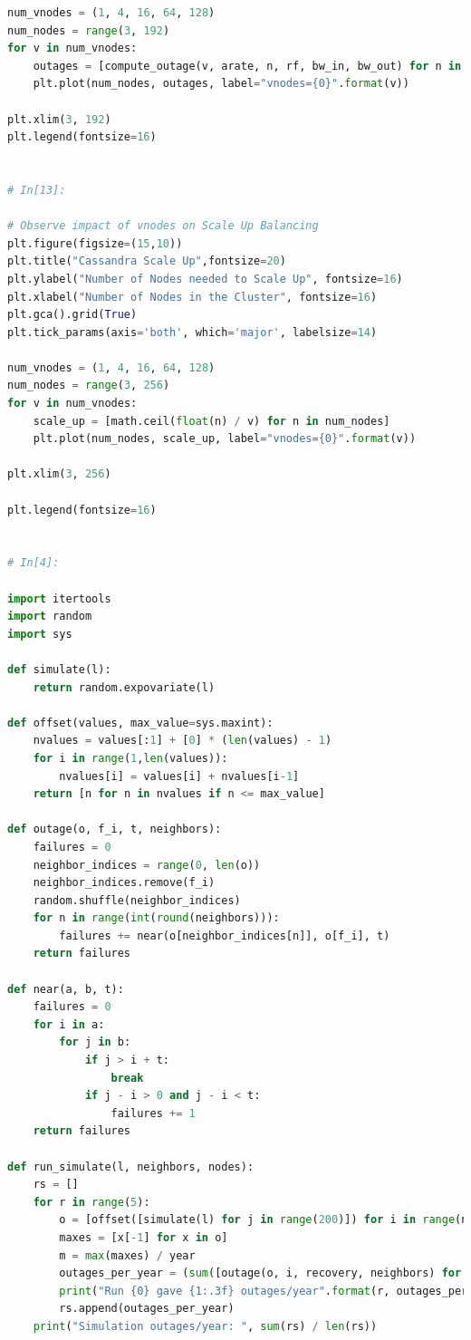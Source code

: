\documentclass{article}
\begin{document}
\begin{lstlisting}[language=Python]
num_vnodes = (1, 4, 16, 64, 128)
num_nodes = range(3, 192)
for v in num_vnodes:
    outages = [compute_outage(v, arate, n, rf, bw_in, bw_out) for n in num_nodes]
    plt.plot(num_nodes, outages, label="vnodes={0}".format(v))

plt.xlim(3, 192)
plt.legend(fontsize=16)


# In[13]:

# Observe impact of vnodes on Scale Up Balancing
plt.figure(figsize=(15,10))
plt.title("Cassandra Scale Up",fontsize=20)
plt.ylabel("Number of Nodes needed to Scale Up", fontsize=16)
plt.xlabel("Number of Nodes in the Cluster", fontsize=16)
plt.gca().grid(True)
plt.tick_params(axis='both', which='major', labelsize=14)

num_vnodes = (1, 4, 16, 64, 128)
num_nodes = range(3, 256)
for v in num_vnodes:
    scale_up = [math.ceil(float(n) / v) for n in num_nodes]
    plt.plot(num_nodes, scale_up, label="vnodes={0}".format(v))

plt.xlim(3, 256)

plt.legend(fontsize=16)


# In[4]:

import itertools
import random
import sys

def simulate(l):
    return random.expovariate(l)

def offset(values, max_value=sys.maxint):
    nvalues = values[:1] + [0] * (len(values) - 1)
    for i in range(1,len(values)):
        nvalues[i] = values[i] + nvalues[i-1]
    return [n for n in nvalues if n <= max_value]

def outage(o, f_i, t, neighbors):
    failures = 0
    neighbor_indices = range(0, len(o))
    neighbor_indices.remove(f_i)
    random.shuffle(neighbor_indices)
    for n in range(int(round(neighbors))):
        failures += near(o[neighbor_indices[n]], o[f_i], t)
    return failures

def near(a, b, t):
    failures = 0
    for i in a:
        for j in b:
            if j > i + t:
                break
            if j - i > 0 and j - i < t:
                failures += 1
    return failures

def run_simulate(l, neighbors, nodes):
    rs = []
    for r in range(5):
        o = [offset([simulate(l) for j in range(200)]) for i in range(nodes)]
        maxes = [x[-1] for x in o]
        m = max(maxes) / year
        outages_per_year = (sum([outage(o, i, recovery, neighbors) for i in range(nodes)]) / m)
        print("Run {0} gave {1:.3f} outages/year".format(r, outages_per_year))
        rs.append(outages_per_year)
    print("Simulation outages/year: ", sum(rs) / len(rs))


\end{lstlisting}
\end{document}
